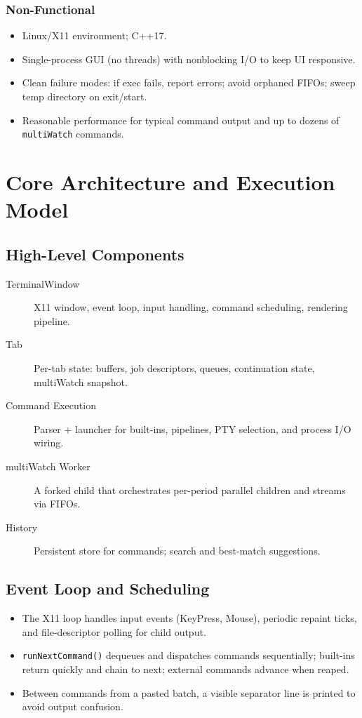 \documentclass[11pt,a4paper]{article}
\begin{document}
\subsubsection{Non-Functional}
\begin{itemize}[leftmargin=*]
  \item Linux/X11 environment; C++17.
  \item Single-process GUI (no threads) with nonblocking I/O to keep UI responsive.
  \item Clean failure modes: if exec fails, report errors; avoid orphaned FIFOs; sweep temp directory on exit/start.
  \item Reasonable performance for typical command output and up to dozens of \texttt{multiWatch} commands.
\end{itemize}

\section{Core Architecture and Execution Model}

\subsection{High-Level Components}
\begin{description}
  \item[TerminalWindow] X11 window, event loop, input handling, command scheduling, rendering pipeline.
  \item[Tab] Per-tab state: buffers, job descriptors, queues, continuation state, multiWatch snapshot.
  \item[Command Execution] Parser + launcher for built-ins, pipelines, PTY selection, and process I/O wiring.
  \item[multiWatch Worker] A forked child that orchestrates per-period parallel children and streams via FIFOs.
  \item[History] Persistent store for commands; search and best-match suggestions.
\end{description}

\subsection{Event Loop and Scheduling}
\begin{itemize}[leftmargin=*]
  \item The X11 loop handles input events (KeyPress, Mouse), periodic repaint ticks, and file-descriptor polling for child output.
  \item \texttt{runNextCommand()} dequeues and dispatches commands sequentially; built-ins return quickly and chain to next; external commands advance when reaped.
  \item Between commands from a pasted batch, a visible separator line is printed to avoid output confusion.
\end{itemize}
\end{document}
